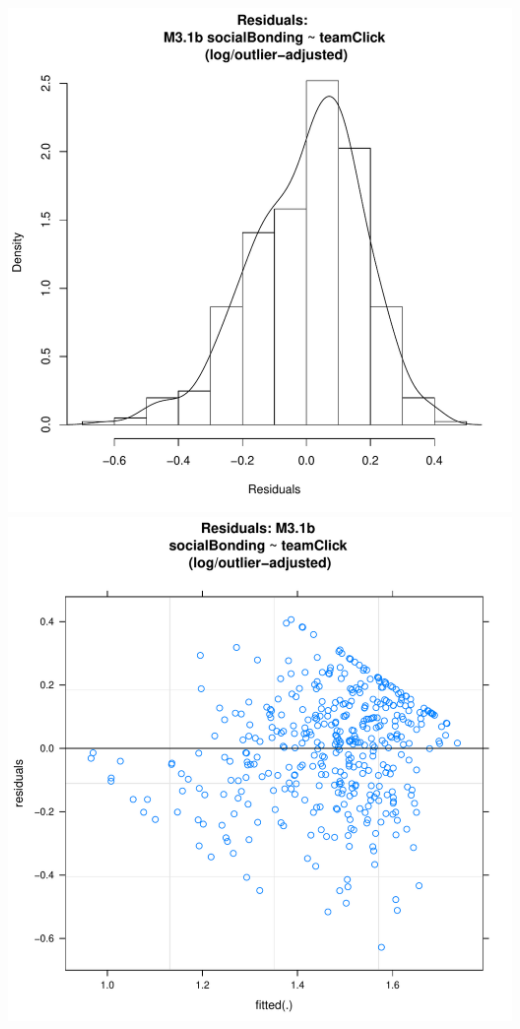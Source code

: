 \documentclass[12pt]{report}
\begin{document}
\newpage
\centering
\includegraphics[scale =.4]{../images/MLM31bOutLogHist.pdf}
\includegraphics[scale =.4]{../images/MLM31bOutLogScatter.pdf}
\end{document}
